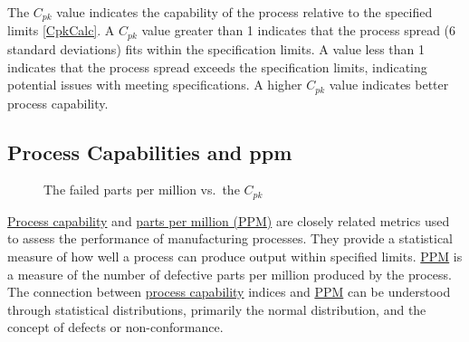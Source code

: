 \documentclass[
  a4paper,
]{scrbook}
\begin{document}
The \(C_{pk}\) value indicates the capability of the process relative to
the specified limits \eqref{CpkCalc}. A \(C_{pk}\) value greater than 1
indicates that the process spread (6 standard deviations) fits within
the specification limits. A value less than 1 indicates that the process
spread exceeds the specification limits, indicating potential issues
with meeting specifications. A higher \(C_{pk}\) value indicates better
process capability.

\subsection{Process Capabilities and
ppm}\label{process-capabilities-and-ppm}

\begin{figure}[H]


\caption{\label{fig-cpk-ppm}The failed parts per million vs.~the
\(C_{pk}\)}

\end{figure}%

\hyperref[Cpk]{Process capability} and \hyperref[ppm]{parts per million
(PPM)} are closely related metrics used to assess the performance of
manufacturing processes. They provide a statistical measure of how well
a process can produce output within specified limits.
\hyperref[ppm]{PPM} is a measure of the number of defective parts per
million produced by the process. The connection between
\hyperref[Cpk]{process capability} indices and \hyperref[ppm]{PPM} can
be understood through statistical distributions, primarily the normal
distribution, and the concept of defects or non-conformance.
\end{document}
